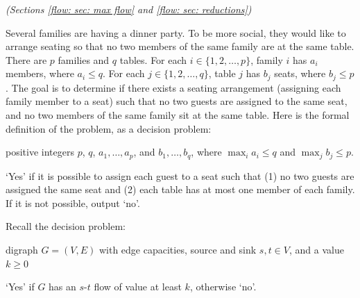 \documentclass[11pt]{article}
\begin{document}
\gradescopeInit






\newpage 


\problem\emph{(Sections \ref{flow: sec: max flow} and \ref{flow: sec: reductions})} 

Several families are having a dinner party.  To be more social, they would like to arrange seating so that no two members of the same family are at the same table.  There are $p$ families and $q$ tables.
For each $i\in\{1,2,\ldots,p\}$, family $i$ has $a_i$ members, where $a_i\le q$.
For each $j\in\{1,2,\ldots,q\}$, table $j$ has $b_j$ seats, where $b_j\le p$.
The goal is to determine if there exists a seating arrangement
(assigning each family member to a seat)
such that no two guests are assigned to the same seat,
and no two members of the same family sit at the same table.
Here is the formal definition of the problem, as a decision problem:

\begin{mylist}\em
\item[] \dotfill
\item[\bf input:] positive integers $p$, $q$, $a_1,\dots,a_p$, and $b_1,\dots,b_q$, where $\max_i a_i \le q$ and $\max_j b_j\le p$.
\item[\bf output:] `\textsf{Yes}' if it is possible to assign each guest to a seat such that (1) no two guests are assigned the same seat and (2) each table has at most one member of each family.
  If it is not possible, output `\textsf{no}'.
\end{mylist}

Recall the  decision problem:
\begin{mylist}\em
\item[\bf input:] digraph $G=(V,E)$ with edge capacities, source and sink $s, t\in V$, and a value $k\ge 0$
\item[\bf output:] `\textsf{Yes}' if $G$ has an $s$-$t$ flow of value at least $k$, otherwise `\textsf{no}'.
\end{mylist}
\end{document}
